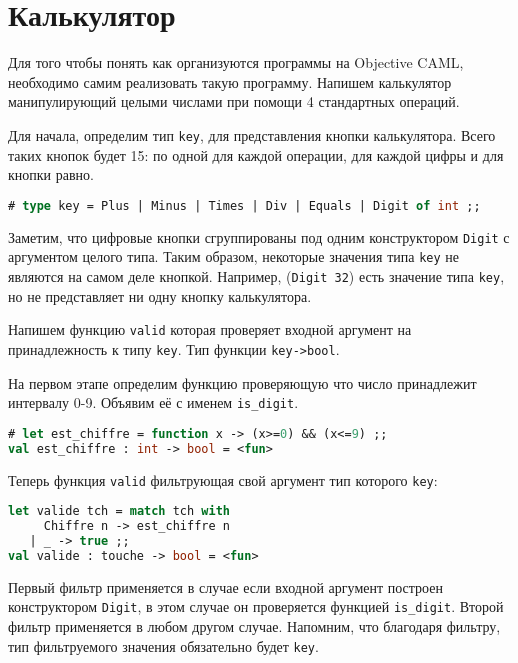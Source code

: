 \section{Калькулятор}
\label{sec:desktop_calculator}

Для того чтобы понять как организуются программы на Objective CAML, необходимо
самим реализовать такую программу. Напишем калькулятор манипулирующий целыми
числами при помощи 4 стандартных операций.

Для начала, определим тип \texttt{key}, для представления кнопки калькулятора.
Всего таких кнопок будет 15: по одной для каждой операции, для каждой цифры и
для кнопки равно.

\begin{lstlisting}[language=OCaml]
# type key = Plus | Minus | Times | Div | Equals | Digit of int ;;
\end{lstlisting}

Заметим, что цифровые кнопки сгруппированы под одним конструктором
\texttt{Digit} с аргументом целого типа. Таким образом, некоторые значения типа
\texttt{key} не являются на самом деле кнопкой. Например, (\texttt{Digit 32})
есть значение типа \texttt{key}, но не представляет ни одну кнопку калькулятора.

Напишем функцию \texttt{valid} которая проверяет входной аргумент на
принадлежность к типу \texttt{key}. Тип функции \texttt{key->bool}.

На первом этапе определим функцию проверяющую что число принадлежит интервалу
0-9. Объявим её с именем \texttt{is\_digit}.

\begin{lstlisting}[language=OCaml]
# let est_chiffre = function x -> (x>=0) && (x<=9) ;;
val est_chiffre : int -> bool = <fun>
\end{lstlisting}

Теперь функция \texttt{valid} фильтрующая свой аргумент тип которого
\texttt{key}:

\begin{lstlisting}[language=OCaml]
let valide tch = match tch with
     Chiffre n -> est_chiffre n
   | _ -> true ;;
val valide : touche -> bool = <fun>
\end{lstlisting}

Первый фильтр применяется в случае если входной аргумент построен конструктором
\texttt{Digit}, в этом случае он проверяется функцией \texttt{is\_digit}. Второй
фильтр применяется в любом другом случае. Напомним, что благодаря фильтру, тип
фильтруемого значения обязательно будет \texttt{key}.

